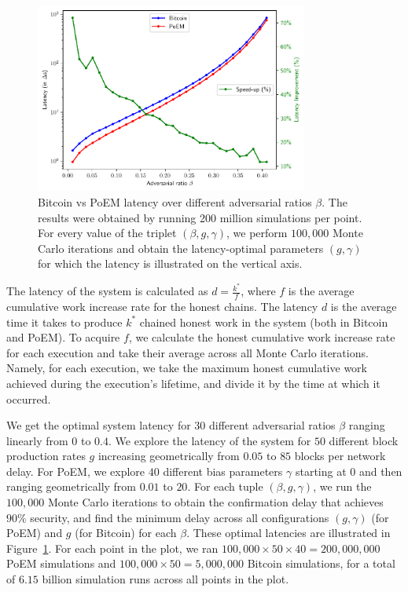 \begin{figure}[h]
    \centering
    \includegraphics[width = 0.8\textwidth]{figures/bitcoin_vs_poem.pdf}

    \caption{Bitcoin vs PoEM latency over different adversarial ratios $\beta$.
             The results were obtained by running 200 million simulations per point.
             For every value of the triplet $(\beta, g, \gamma)$, we perform
             $100{,}000$ Monte Carlo iterations and obtain the latency-optimal parameters
             $(g, \gamma)$ for which the latency is illustrated on the vertical axis.}
    \label{fig:bitcoin_vs_poem}
\end{figure}

The latency of the system is calculated as $d = \frac{k^*}{f}$, where $f$ is the average cumulative work increase rate for the honest chains.
The latency $d$ is the average time it takes to produce $k^*$ chained honest work in the system (both in Bitcoin and PoEM).
To acquire $f$, we calculate the honest cumulative work increase rate for each execution and take their average across all Monte Carlo iterations.
Namely, for each execution, we take the maximum honest cumulative work achieved during the execution's lifetime, and divide it by the time
at which it occurred.

We get the optimal system latency for $30$ different adversarial ratios $\beta$ ranging linearly from $0$ to $0.4$.
We explore the latency of the system for $50$ different block production rates $g$ increasing geometrically from $0.05$ to $85$ blocks per network delay.
For PoEM, we explore $40$ different bias parameters $\gamma$ starting at $0$ and then ranging geometrically from $0.01$ to $20$.
For each tuple $(\beta, g, \gamma)$, we run the $100{,}000$ Monte Carlo iterations to obtain the
confirmation delay that achieves $90\%$ security, and find the minimum delay across all configurations $(g, \gamma)$ (for PoEM)
and $g$ (for Bitcoin) for each $\beta$.
These optimal latencies are illustrated in Figure~\ref{fig:bitcoin_vs_poem}.
For each point in the plot, we ran $100{,}000 \times 50 \times 40 = 200{,}000{,}000$ PoEM simulations
and $100{,}000 \times 50 = 5{,}000{,}000$ Bitcoin simulations,
for a total of $6.15$ billion simulation runs across all points in the plot.


